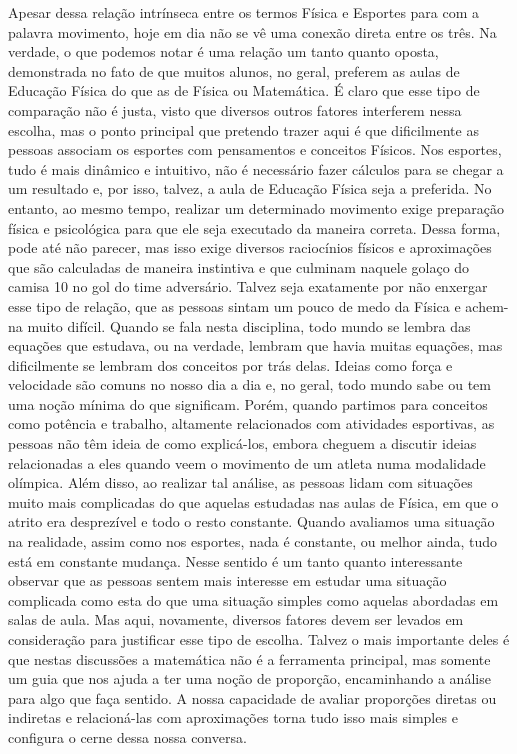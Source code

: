 \begin{multicols}{2}
Apesar dessa relação intrínseca entre os termos Física e Esportes para com a palavra movimento, hoje em dia não se vê uma conexão direta entre os três. Na verdade, o que podemos notar é uma relação um tanto quanto oposta, demonstrada no fato de que muitos alunos, no geral, preferem as aulas de Educação Física do que as de Física ou Matemática. É claro que esse tipo de comparação não é justa, visto que diversos outros fatores interferem nessa escolha, mas o ponto principal que pretendo trazer aqui é que dificilmente as pessoas associam os esportes com pensamentos e conceitos Físicos. Nos esportes, tudo é mais dinâmico e intuitivo, não é necessário fazer cálculos para se chegar a um resultado e, por isso, talvez, a aula de Educação Física seja a preferida. No entanto, ao mesmo tempo, realizar um determinado movimento exige preparação física e psicológica para que ele seja executado da maneira correta. Dessa forma, pode até não parecer, mas isso exige diversos raciocínios físicos e aproximações que são calculadas de maneira instintiva e que culminam naquele golaço do camisa 10 no gol do time adversário. 
 Talvez seja exatamente por não enxergar esse tipo de relação, que as pessoas sintam um pouco de medo da Física e achem-na muito difícil. Quando se fala nesta disciplina, todo mundo se lembra das equações que estudava, ou na verdade, lembram que havia muitas equações, mas dificilmente se lembram dos conceitos por trás delas. Ideias como força e velocidade são comuns no nosso dia a dia e, no geral, todo mundo sabe ou tem uma noção mínima do que significam. Porém, quando partimos para conceitos como potência e trabalho, altamente relacionados com atividades esportivas, as pessoas não têm ideia de como explicá-los, embora cheguem a discutir ideias relacionadas a eles quando veem o movimento de um atleta numa modalidade olímpica. Além disso, ao realizar tal análise, as pessoas lidam com situações muito mais complicadas do que aquelas estudadas nas aulas de Física, em que o atrito era desprezível e todo o resto constante. Quando avaliamos uma situação na realidade, assim como nos esportes, nada é constante, ou melhor ainda, tudo está em constante mudança. Nesse sentido é um tanto quanto interessante observar que as pessoas sentem mais interesse em estudar uma situação complicada como esta do que uma situação simples como aquelas abordadas em salas de aula. Mas aqui, novamente, diversos fatores devem ser levados em consideração para justificar esse tipo de escolha. Talvez o mais importante deles é que nestas discussões a matemática não é a ferramenta principal, mas somente um guia que nos ajuda a ter uma noção de proporção, encaminhando a análise para algo que faça sentido. A nossa capacidade de avaliar proporções diretas ou indiretas e relacioná-las com aproximações torna tudo isso mais simples e configura o cerne dessa nossa conversa.
    

\end{multicols}
